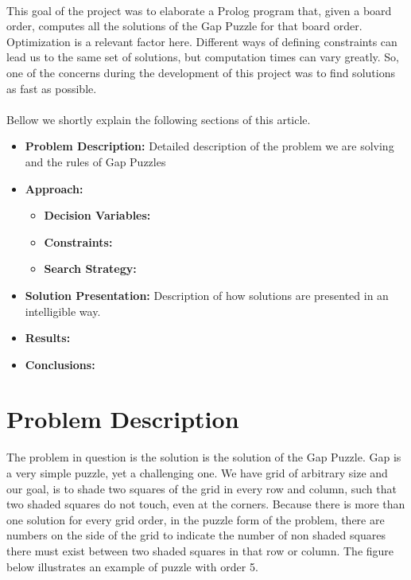 \documentclass[runningheads]{llncs}
\begin{document}
\paragraph{}
This goal of the project was to elaborate a Prolog program that, given a board order, computes all the solutions of the 
Gap Puzzle for that board order. 
Optimization is a relevant factor here. Different ways of defining constraints can lead us to the same set of 
solutions, but computation times can vary greatly. So, one of the concerns during the development of this project 
was to find solutions as fast as possible. 

\paragraph{}
Bellow we shortly explain the following sections of this article.

\begin{itemize}
    \item \textbf{Problem Description:} Detailed description of the problem we are solving and the rules of Gap Puzzles
    
    \item \textbf{Approach:} 
    \begin{itemize}
        \item \textbf{Decision Variables:} 
        \item \textbf{Constraints:}
        \item \textbf{Search Strategy:} 
    \end{itemize}

    \item \textbf{Solution Presentation:} Description of how solutions are presented in an intelligible way.
    \item \textbf{Results:}
    \item \textbf{Conclusions:}
\end{itemize}

\section{Problem Description}
The problem in question is the solution is the solution of the Gap Puzzle. Gap is a very simple puzzle, yet a challenging
one. We have grid of arbitrary size and our goal, is to shade two squares of the grid in every row and column, such that 
two shaded squares do not touch, even at the corners. Because there is more than one solution for every grid order,
in the puzzle form of the problem, there are numbers on the side of the grid to indicate the number of non shaded squares
there must exist between two shaded squares in that row or column. The figure below illustrates an example of puzzle with
order 5.
\end{document}
